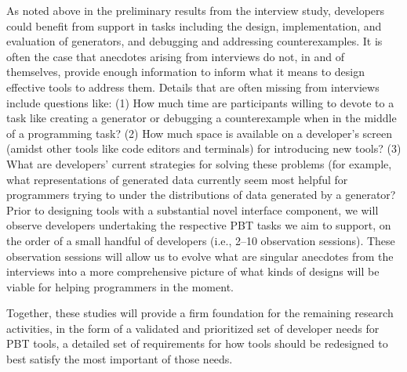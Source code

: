  

\label{sec:observations}

As noted above in the preliminary results from the interview study, developers
could benefit from support in tasks including the design, implementation, and
evaluation of generators, and debugging and addressing counterexamples. It is
often the case that anecdotes arising from interviews do not, in and of
themselves, provide enough information to inform what it means to design
effective tools to address them. Details that are often missing from interviews
include questions like: (1) How much time are participants willing to devote to
a task like creating a generator or debugging a counterexample when in the
middle of a programming task? (2) How much space is available on a developer's
screen (amidst other tools like code editors and terminals) for introducing new
tools? (3) What are developers' current strategies for solving these problems
(for example, what representations of generated data currently seem most helpful
for programmers trying to under the distributions of data generated by a
generator? Prior to designing tools with a substantial novel interface
component, we will observe developers undertaking the respective PBT tasks we
aim to support, on the order of a small handful of developers (i.e., 2--10
observation sessions). These observation sessions will allow us to evolve what
are singular anecdotes from the interviews into a more comprehensive picture of
what kinds of designs will be viable for helping programmers in the moment.


 

Together, these studies will provide a firm foundation for the remaining
research activities, in the form of a validated and prioritized set of developer
needs for PBT tools, a detailed set of requirements for how tools should be
redesigned to best satisfy the most important of those needs.

\label{sec:spec}

